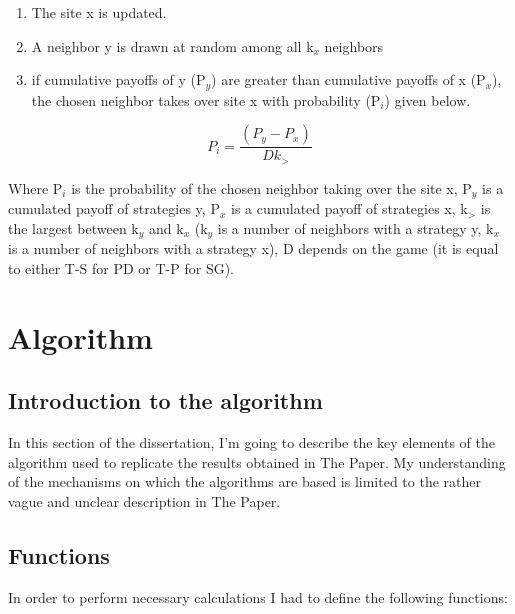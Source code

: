 \documentclass[english, twoside, 12pt, a4paper]{article}
\theoremstyle{definition}
\theoremstyle{plain}
\theoremstyle{remark}
\begin{document}
\begin{enumerate}
  \item The site x is updated.
  \item A neighbor y is drawn at random among all k$_{x}$ neighbors
  \item if cumulative payoffs of y (P$_{y}$) are greater than cumulative payoffs of x (P$_{x}$), the chosen neighbor takes over site x with probability (P$_{i}$) given below.
\end{enumerate}


\begin{center}

\[
  P_{i} = \frac{(P_{y} - P_{x})}{Dk_{>}}
  \]
\end{center}
Where P$_{i}$ is the probability of the chosen neighbor taking over the site x, P$_{y}$ is a cumulated payoff of strategies y, P$_{x}$ is a cumulated payoff 
of strategies x, k$_{>}$ is the largest between k$_{y}$ and k$_{x}$ (k$_{y}$ is a number of neighbors with a strategy y, k$_{x}$ is a number of neighbors with a 
strategy x), D depends on the game (it is equal to either T-S for PD or T-P for SG).

\section{Algorithm}
\subsection{Introduction to the algorithm}
In this section of the dissertation, I'm going to describe the key elements of the algorithm used to replicate the results obtained in The Paper. 
My understanding of the mechanisms on which the algorithms are based is limited to the rather vague and unclear description in The Paper. 

\subsection{Functions}
In order to perform necessary calculations I had to define the following functions:
\end{document}
